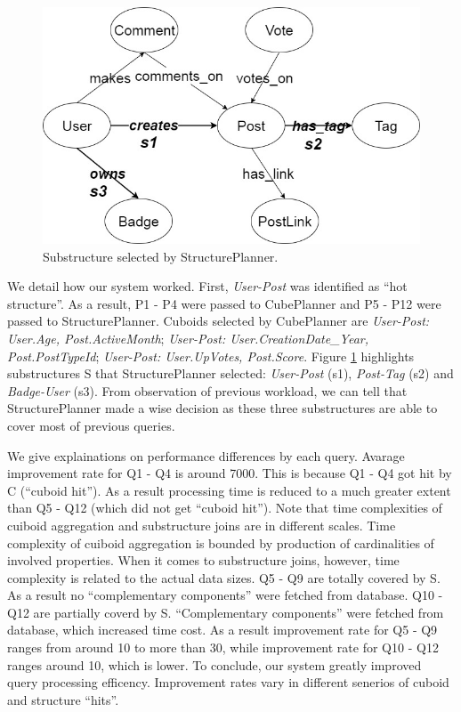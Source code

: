 \begin{figure}[H]
	\centering
	\includegraphics[scale=0.5]{"pic/MetaGraphExperiment_Hot (1)"}
	\caption{Substructure selected by StructurePlanner.}
	\label{fig:metagraphexperimenthot}
\end{figure}

We detail how our system worked. First, \textit{User-Post} was identified as ``hot structure''. As a result, P1 - P4 were passed to CubePlanner and P5 - P12 were passed to StructurePlanner. Cuboids selected by CubePlanner are \textit{User-Post: User.Age, Post.ActiveMonth}; \textit{User-Post: User.CreationDate\_Year, Post.PostTypeId}; \textit{User-Post: User.UpVotes, Post.Score}. Figure \ref{fig:metagraphexperimenthot} highlights substructures S that StructurePlanner selected:  \textit{User-Post} (s1), \textit{Post-Tag} (s2) and \textit{Badge-User} (s3). From observation of previous workload, we can tell that StructurePlanner made a wise decision as these three substructures are able to cover most of previous queries. 

We give explainations on performance differences by each query. Avarage improvement rate for Q1 - Q4 is around 7000. This is because Q1 - Q4 got hit by C (``cuboid hit''). As a result processing time is reduced to a much greater extent than Q5 - Q12 (which did not get ``cuboid hit''). Note that time complexities of cuiboid aggregation and substructure joins are in different scales. Time complexity of cuiboid aggregation is bounded by production of cardinalities of involved properties. When it comes to substructure joins, however, time complexity is related to the actual data sizes. Q5 - Q9 are totally covered by S. As a result no ``complementary components'' were fetched from database.  Q10 - Q12 are partially coverd by S.  ``Complementary components'' were fetched from database, which increased time cost. As a result improvement rate for Q5 - Q9 ranges from around 10 to more than 30, while improvement rate for Q10 - Q12 ranges around 10, which is lower. To conclude, our system greatly improved query processing efficency. Improvement rates vary in different senerios of cuboid and structure ``hits''.




